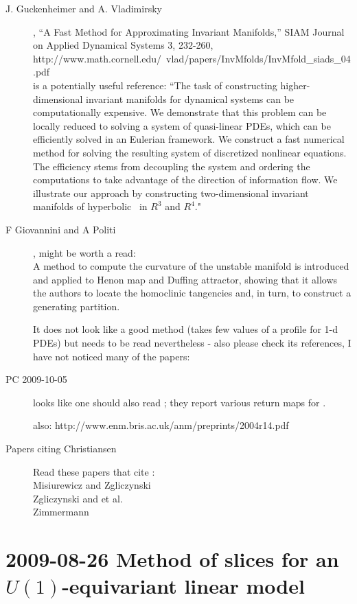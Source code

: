 \begin{description}
\item[J. Guckenheimer and A. Vladimirsky],
``A Fast Method for Approximating Invariant Manifolds,''
SIAM Journal on Applied Dynamical Systems
3, 232-260,
\\
http://www.math.cornell.edu/~vlad/papers/InvMfolds/InvMfold\_siads\_04.pdf
\\
is a potentially useful reference:
``The task of constructing higher-dimensional invariant
manifolds for dynamical systems can be computationally
expensive. We demonstrate that this problem can be locally
reduced to solving a system of quasi-linear PDEs, which can be
efficiently solved in an Eulerian framework. We construct a
fast numerical method for solving the resulting system of
discretized nonlinear equations. The efficiency stems from
decoupling the system and ordering the computations to take
advantage of the direction of information flow. We illustrate
our approach by constructing two-dimensional invariant
manifolds of hyperbolic \eqva\ in $R^3$ and $R^4$."

\item[F Giovannini and A Politi], might be worth a read:
\\
A method to compute the curvature of the unstable manifold is
introduced and applied to Henon map and Duffing attractor,
showing that it allows the authors to locate the homoclinic
tangencies and, in turn, to construct a generating partition.

It does not look like a good method (takes few values of a profile
for 1-d PDEs) but needs to be read nevertheless - also please
check its references, I have not noticed many of the papers:

\item[PC 2009-10-05]
looks like one should also read ; they
report various return maps for \cLe.


also:
http://www.enm.bris.ac.uk/anm/preprints/2004r14.pdf

\item[Papers citing Christiansen \etal]
Read these papers  that cite :
    \\
Misiurewicz and Zgliczynski
    \\
Zgliczynski and et al.
    \\
Zimmermann



\end{description}

\section{2009-08-26 Method of slices for an $U(1)$-equivariant linear model}
\renewcommand{\ssp}{a}


